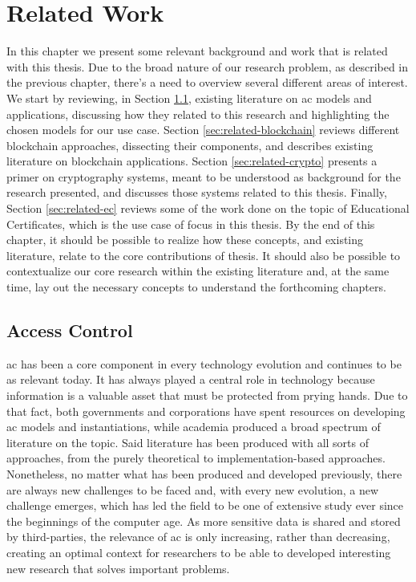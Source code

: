 \chapter{Related Work}
\label{chap:related}

In this chapter we present some relevant background and work that is related with this thesis. Due to the broad nature of our research problem, as described in the previous chapter, there's a need to overview several different areas of interest. We start by reviewing, in Section \ref{sec:related-ac}, existing literature on \gls{ac} models and applications, discussing how they related to this research and highlighting the chosen models for our use case. Section \ref{sec:related-blockchain} reviews different blockchain approaches, dissecting their components, and describes existing literature on blockchain applications. Section \ref{sec:related-crypto} presents a primer on cryptography systems, meant to be understood as background for the research presented, and discusses those systems related to this thesis. Finally, Section \ref{sec:related-ec} reviews some of the work done on the topic of Educational Certificates, which is the use case of focus in this thesis. By the end of this chapter, it should be possible to realize how these concepts, and existing literature, relate to the core contributions of thesis. It should also be possible to contextualize our core research within the existing literature and, at the same time, lay out the necessary concepts to understand the forthcoming chapters.

\section{Access Control}
\label{sec:related-ac}

\glsdesc{ac} has been a core component in every technology evolution and continues to be as relevant today. It has always played a central role in technology because information is a valuable asset that must be protected from prying hands. Due to that fact, both governments and corporations have spent resources on developing \gls{ac} models and instantiations, while academia produced a broad spectrum of literature on the topic. Said literature has been produced with all sorts of approaches, from the purely theoretical to implementation-based approaches. Nonetheless, no matter what has been produced and developed previously, there are always new challenges to be faced and, with every new evolution, a new challenge emerges, which has led the field to be one of extensive study ever since the beginnings of the computer age. As more sensitive data is shared and stored by third-parties, the relevance of \gls{ac} is only increasing, rather than decreasing, creating an optimal context for researchers to be able to developed interesting new research that solves important problems.

